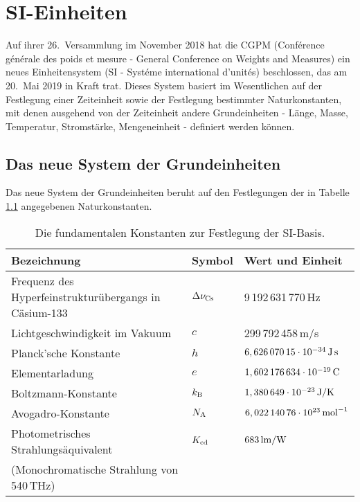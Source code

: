 

\chapter{SI-Einheiten}
\label{chap_SI}

%
Auf ihrer 26.\ Versammlung im November 2018 hat die CGPM (Conf\'{e}rence g\'{e}n\'{e}rale des poids et mesure -
General Conference on Weights and Measures)  
ein neues Einheitensystem (SI - Syst\'{e}me international d'unit\'{e}s) 
beschlossen, das am 20.\ Mai 2019 in Kraft trat. Dieses System basiert im Wesentlichen auf der
Festlegung einer Zeiteinheit sowie der Festlegung bestimmter Naturkonstanten, mit denen ausgehend von der
Zeiteinheit andere Grundeinheiten - L\"ange, Masse, Temperatur, Stromst\"arke, 
Mengeneinheit - definiert werden k\"onnen. 


\section{Das neue System der Grundeinheiten}

Das neue System der Grundeinheiten beruht auf den Festlegungen der in Tabelle \ref{tab_SI}
angegebenen Naturkonstanten.%
%
%

\begin{table}[htb]
\begin{tabular}{l|l|l}
Bezeichnung & Symbol & Wert und Einheit \\ \hline
Frequenz des Hyperfeinstruktur\"ubergangs in C\"asium-133 & $\Delta \nu_{\rm Cs}$ &
        9\,192\,631\,770\,{\rm Hz} \\
Lichtgeschwindigkeit im Vakuum & $c$ & 299\,792\,458\,{\rm m/s} \\ 
Planck'sche Konstante & $h$ & $6,626\,070\,15 \cdot 10^{-34}\,{\rm J\,s}$ \\
Elementarladung & $e$ & $1,602\,176\,634 \cdot 10^{-19}\,{\rm C}$ \\
Boltzmann-Konstante & $k_{\rm B}$ & $1,380\,649 \cdot 10^{-23}\,{\rm J/K}$ \\
Avogadro-Konstante & $N_{\rm A}$ & $ 6,022\,140\,76 \cdot 10^{23}\,{\rm mol}^{-1}$ \\
Photometrisches Strahlungs\"aquivalent & $K_{\rm cd}$ & $683\,{\rm lm/W}$ \\[-0.1cm]
(Monochromatische Strahlung von 540\,THz) & &  \\ \hline        
\end{tabular}
\caption{\label{tab_SI}%
Die fundamentalen Konstanten zur Festlegung der SI-Basis.}
\end{table}

